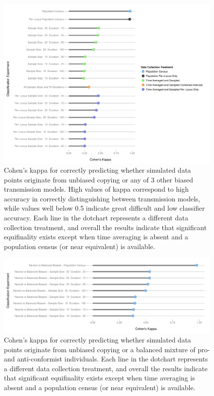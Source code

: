 \documentclass[10pt,letterpaper]{article}
\begin{document}
\begin{figure}[ht]
\centering
\includegraphics[scale=0.5]{figure/unbiased-biased-kappa-dotchart.pdf}
\caption{Cohen's kappa for correctly predicting whether simulated data points originate from unbiased copying or any of 3 other biased transmission models.  High values of kappa correspond to high accuracy in correctly distinguishing between transmission models, while values well below 0.5 indicate great difficult and low classifier accuracy.  Each line in the dotchart represents a different data collection treatment, and overall the results indicate that significant equifinality exists except when time averaging is absent and a population census (or near equivalent) is available.}
\label{img:unbiased-biased-kappa}
\end{figure}

\begin{figure}[ht]
\centering
\includegraphics[scale=0.5]{figure/unbiased-balbiased-kappa-dotchart.pdf}
\caption{Cohen's kappa for correctly predicting whether simulated data points originate from unbiased copying or a balanced mixture of pro- and anti-conformist individuals.  Each line in the dotchart represents a different data collection treatment, and overall the results indicate that significant equifinality exists except when time averaging is absent and a population census (or near equivalent) is available.}
\label{img:unbiased-biased-kappa}
\end{figure}
\end{document}
